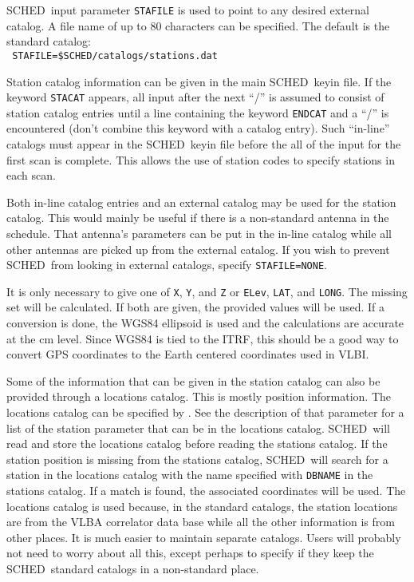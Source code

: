 \documentclass{report}
\newcommand{\schedb}{{\sc SCHED~}}
\begin{document}
\schedb input parameter {\tt STAFILE} is used to point to any desired
external catalog.  A file name of up to 80 characters can be
specified. The default is the standard catalog: \\ {\tt
STAFILE=\$SCHED/catalogs/stations.dat}

Station catalog information can be given in the main \schedb keyin
file. If the keyword {\tt STACAT} appears, all input after the next
``/'' is assumed to consist of station catalog entries until a line
containing the keyword {\tt ENDCAT} and a ``/'' is encountered (don't
combine this keyword with a catalog entry).  Such ``in-line'' catalogs
must appear in the \schedb keyin file before the all of the input
for the first scan is complete.  This allows the use of station codes
to specify stations in each scan.

Both in-line catalog entries and an external catalog may be used for
the station catalog.  This would mainly be useful if there is a
non-standard antenna in the schedule.  That antenna's parameters can
be put in the in-line catalog while all other antennas are picked up
from the external catalog.  If you wish to prevent \schedb from
looking in external catalogs, specify {\tt STAFILE=NONE}.

It is only necessary to give one of {\tt X}, {\tt Y}, and {\tt Z} or
{\tt ELev}, {\tt LAT}, and {\tt LONG}.  The missing set will be
calculated.  If both are given, the provided values will be used.  If
a conversion is done, the WGS84 ellipsoid is used and the calculations
are accurate at the cm level.  Since WGS84 is tied to the ITRF, this
should be a good way to convert GPS coordinates to the Earth centered
coordinates used in VLBI.

Some of the information that can be given in the station catalog can
also be provided through a locations catalog.  This is mostly position
information.  The locations catalog can be specified by .  See the description of that parameter for a
list of the station parameter that can be in the locations catalog.
\schedb will read and store the locations catalog before reading the
stations catalog.  If the station position is missing from the
stations catalog, \schedb will search for a station in the locations
catalog with the name specified with {\tt DBNAME} in the stations
catalog.  If a match is found, the associated coordinates will be
used.  The locations catalog is used because, in the standard
catalogs, the station locations are from the VLBA correlator data base
while all the other information is from other places.  It is much
easier to maintain separate catalogs.  Users will probably not need to
worry about all this, except perhaps to specify  if they keep the \schedb standard catalogs in a
non-standard place.
\end{document}
